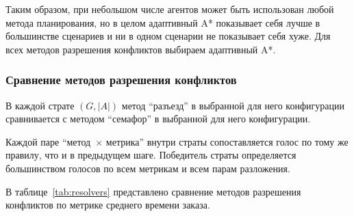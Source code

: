 Таким образом, при небольшом числе агентов может быть использован любой метода планирования, но в целом
адаптивный A* показывает себя лучше в большинстве сценариев и ни в одном сценарии не показывает себя хуже.
Для всех методов разрешения конфликтов выбираем адаптивный A*.

\subsubsection{Сравнение методов разрешения конфликтов}

В каждой страте $(G, |A|)$ метод \enquote{разъезд} в выбранной для него конфигурации сравнивается с 
методом \enquote{семафор} в выбранной для него конфигурации.

Каждой паре \enquote{метод~$\times$ метрика} внутри страты сопоставляется голос по тому же правилу, 
что и в предыдущем шаге. Победитель страты определяется большинством голосов по всем 
метрикам и всем парам разложения.

В таблице~\ref{tab:resolvers} представлено сравнение методов разрешения конфликтов по метрике среднего времени заказа.

